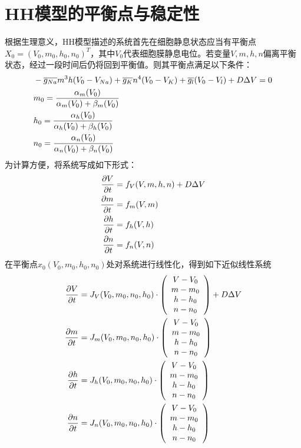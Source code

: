 \documentclass[
pdflinks,
]{xjtuthesis}
\begin{document}
\section{HH模型的平衡点与稳定性}
根据生理意义，HH模型描述的系统首先在细胞静息状态应当有平衡点$X_0=(V_0,m_0,h_0,n_0)^T$，其中$V_0$代表细胞膜静息电位。若变量$V,m,h,n$偏离平衡状态，经过一段时间后仍将回到平衡值。则其平衡点满足以下条件：
\begin{align}
\notag & -\overline{g_{Na}} m^3h(V_0 -V_{Na})+ \overline{g_{K}} n^4(V_0-V_{K})+\overline{g_l}(V_0-V_{l}) +D \Delta V=0 \\
& m_0 = \dfrac{\alpha_m (V_0)}{\alpha_m (V_0)+\beta_m (V_0)} \\
\notag & h_0 =\frac{ \alpha_h (V_0)}{ \alpha_h (V_0)+ \beta_h (V_0)} \\
\notag & n_0= \frac{\alpha_n (V_0)}{\alpha_n (V_0)+\beta_n (V_0)}
\end{align}
为计算方便，将系统写成如下形式：
\begin{align}
\notag \frac{\partial V}{\partial t} &= f_V(V,m,h,n)+D\Delta V\\
\frac{\partial m}{\partial t} &= f_m(V,m) \\
\notag \frac{\partial h}{\partial t} &= f_h(V,h)\\
\notag \frac{\partial n}{\partial t} &= f_n(V,n) 
\end{align}
在平衡点$x_0(V_{0},m_{0},h_{0},n_{0})$处对系统进行线性化，得到如下近似线性系统
\begin{align}
\notag \frac{\partial V}{\partial t} &= J_{V}(V_0,m_0,n_0,h_0)\cdot
\left(
\begin{array}{c}
V-V_0\\
m-m_0\\
h-h_0\\
n-n_0
\end{array}
\right)
+D\Delta V\\
\frac{\partial m}{\partial t} &= J_{m}(V_0,m_0,n_0,h_0)\cdot
\left(\begin{array}{c}
V-V_0\\
m-m_0\\
h-h_0\\
n-n_0
\end{array}
\right) \\
\notag \frac{\partial h}{\partial t} &= J_{h}(V_0,m_0,n_0,h_0)\cdot
\left(
\begin{array}{c}
V-V_0\\
m-m_0\\
h-h_0\\
n-n_0
\end{array}
\right)\\
\notag \frac{\partial n}{\partial t} &= J_{n}(V_0,m_0,n_0,h_0)\cdot
\left(
\begin{array}{c}
V-V_0\\
m-m_0\\
h-h_0\\
n-n_0
\end{array}
\right)
\end{align}
\end{document}
